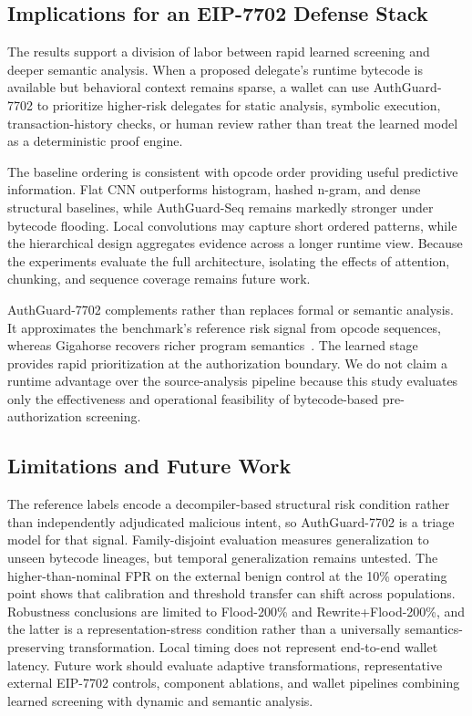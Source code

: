 \documentclass[conference]{IEEEtran}
\begin{document}
\subsection{Implications for an EIP-7702 Defense Stack}

The results support a division of labor between rapid learned screening and deeper semantic analysis. When a proposed delegate's runtime bytecode is available but behavioral context remains sparse, a wallet can use AuthGuard-7702 to prioritize higher-risk delegates for static analysis, symbolic execution, transaction-history checks, or human review rather than treat the learned model as a deterministic proof engine.

The baseline ordering is consistent with opcode order providing useful predictive information. Flat CNN outperforms histogram, hashed n-gram, and dense structural baselines, while AuthGuard-Seq remains markedly stronger under bytecode flooding. Local convolutions may capture short ordered patterns, while the hierarchical design aggregates evidence across a longer runtime view. Because the experiments evaluate the full architecture, isolating the effects of attention, chunking, and sequence coverage remains future work.

AuthGuard-7702 complements rather than replaces formal or semantic analysis. It approximates the benchmark's reference risk signal from opcode sequences, whereas Gigahorse recovers richer program semantics~\cite{gigahorse2019}. The learned stage provides rapid prioritization at the authorization boundary. We do not claim a runtime advantage over the source-analysis pipeline because this study evaluates only the effectiveness and operational feasibility of bytecode-based pre-authorization screening.

\subsection{Limitations and Future Work}

The reference labels encode a decompiler-based structural risk condition rather than independently adjudicated malicious intent, so AuthGuard-7702 is a triage model for that signal. Family-disjoint evaluation measures generalization to unseen bytecode lineages, but temporal generalization remains untested. The higher-than-nominal FPR on the external benign control at the 10\% operating point shows that calibration and threshold transfer can shift across populations. Robustness conclusions are limited to Flood-200\% and Rewrite+Flood-200\%, and the latter is a representation-stress condition rather than a universally semantics-preserving transformation. Local timing does not represent end-to-end wallet latency. Future work should evaluate adaptive transformations, representative external EIP-7702 controls, component ablations, and wallet pipelines combining learned screening with dynamic and semantic analysis.
\end{document}
